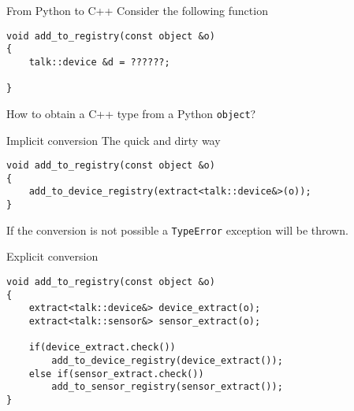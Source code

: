 

\begin{frame}[fragile]{From Python to C++}
    Consider the following function 
    \vspace{0.1\textheight}
    \begin{verbatim}
void add_to_registry(const object &o)
{
    talk::device &d = ??????;

}
    \end{verbatim}
    \vspace{0.1\textheight}
    How to obtain a C++ type from a Python \texttt{object}?
\end{frame}

\begin{frame}[fragile]{Implicit conversion}
    The quick and dirty way
    \vspace{0.1\textheight}
    \begin{verbatim}
void add_to_registry(const object &o)
{
    add_to_device_registry(extract<talk::device&>(o));
}
    \end{verbatim}
    \vspace{0.1\textheight}
    If the conversion is not possible a \texttt{TypeError} exception will be
    thrown.
\end{frame}

\begin{frame}[fragile]{Explicit conversion}
    \begin{verbatim}
void add_to_registry(const object &o)
{
    extract<talk::device&> device_extract(o);
    extract<talk::sensor&> sensor_extract(o);

    if(device_extract.check())
        add_to_device_registry(device_extract());
    else if(sensor_extract.check())
        add_to_sensor_registry(sensor_extract());
}
    \end{verbatim}
\end{frame}
